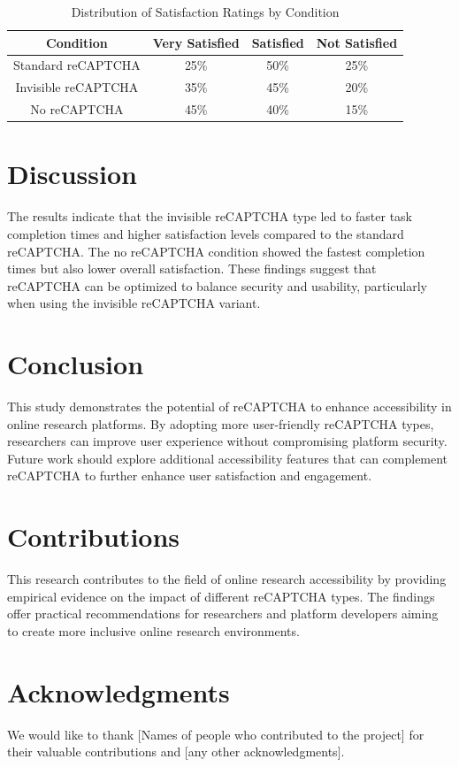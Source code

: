 \begin{table}[ht]
\centering
\begin{tabular}{|c|c|c|c|}
\hline
\textbf{Condition} & \textbf{Very Satisfied} & \textbf{Satisfied} & \textbf{Not Satisfied} \\ \hline
Standard reCAPTCHA & 25\% & 50\% & 25\% \\
Invisible reCAPTCHA & 35\% & 45\% & 20\% \\
No reCAPTCHA & 45\% & 40\% & 15\% \\ \hline
\end{tabular}
\caption{Distribution of Satisfaction Ratings by Condition}
\label{tab:satisfaction_ratings}
\end{table}

\section{Discussion}
The results indicate that the invisible reCAPTCHA type led to faster task completion times and higher satisfaction levels compared to the standard reCAPTCHA. The no reCAPTCHA condition showed the fastest completion times but also lower overall satisfaction. These findings suggest that reCAPTCHA can be optimized to balance security and usability, particularly when using the invisible reCAPTCHA variant.

\section{Conclusion}
This study demonstrates the potential of reCAPTCHA to enhance accessibility in online research platforms. By adopting more user-friendly reCAPTCHA types, researchers can improve user experience without compromising platform security. Future work should explore additional accessibility features that can complement reCAPTCHA to further enhance user satisfaction and engagement.

\section{Contributions}
This research contributes to the field of online research accessibility by providing empirical evidence on the impact of different reCAPTCHA types. The findings offer practical recommendations for researchers and platform developers aiming to create more inclusive online research environments.

\section*{Acknowledgments}
We would like to thank [Names of people who contributed to the project] for their valuable contributions and [any other acknowledgments].

